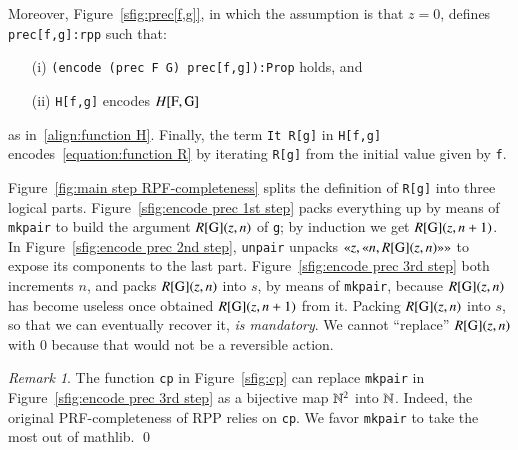 \documentclass[preprint]{elsarticle}
\theoremstyle{remark}
\newtheorem{remark}{Remark}
\newcommand{\RPP}{\textsf{RPP}\xspace}
\newcommand{\PRF}{\textsf{PRF}\xspace}
\newcommand{\MATHLIB}{\textsf{mathlib}\xspace}
\begin{document}
Moreover, Figure~\ref{sfig:prec[f,g]}, in which the assumption is that $ z = 0 $, defines \lstinline|prec[f,g]:rpp| such that:
\begin{enumerate}
    \item[(i)]
    \lstinline|(encode (prec F G) prec[f,g]):Prop| holds, and
    \item [(ii)]
    \lstinline|H[f,g]| encodes $ H[\mbox{\lstinline|F|},\mbox{\lstinline|G|}]$
\end{enumerate}
as in~\eqref{align:function H}.
Finally, the term \lstinline|It R[g]| in \lstinline|H[f,g]| encodes~\eqref{equation:function R} by iterating \lstinline|R[g]| from the initial value given by \lstinline|f|.

Figure~\ref{fig:main step RPF-completeness} splits the definition of \lstinline|R[g]| into three logical parts.
Figure~\ref{sfig:encode prec 1st step} packs everything up by means of \lstinline|mkpair| to build the argument $ R[\mbox{\lstinline|G|}](z,n) $ of \lstinline|g|; by induction we get
$ R[\mbox{\lstinline|G|}](z,n+1) $.
In Figure~\ref{sfig:encode prec 2nd step}, \lstinline|unpair| unpacks $ \gl z, \gl n, R[\mbox{\lstinline|G|}](z,n) \gr \gr $ to expose its components to the last part.
Figure~\ref{sfig:encode prec 3rd step} both increments $ n $, and packs $ R[\mbox{\lstinline|G|}](z,n) $ into $ s $, by means of \lstinline|mkpair|, because $ R[\mbox{\lstinline|G|}](z,n) $ has become useless once obtained $ R[\mbox{\lstinline|G|}](z,n+1) $ from it. Packing $ R[\mbox{\lstinline|G|}](z,n) $ into $ s $, so that we can eventually recover it, \emph{is mandatory}. We cannot ``replace'' $ R[\mbox{\lstinline|G|}](z,n) $ with $ 0 $ because that would not be a reversible action.

\begin{remark}
The function \lstinline|cp| in Figure~\ref{sfig:cp} can replace \lstinline|mkpair| in Figure~\ref{sfig:encode prec 3rd step} as a bijective map $ \mathbb{N}^2$ into $\mathbb{N}$. Indeed, the original \PRF-completeness of \RPP relies on \lstinline|cp|. We favor \lstinline|mkpair| to take the most out of \MATHLIB.
\qed
\end{remark}
\end{document}
